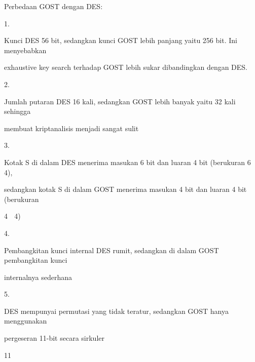 \documentclass{article}
\begin{document}

Perbedaan GOST dengan DES:

1.

Kunci DES 56 bit, sedangkan kunci GOST lebih panjang yaitu 256 bit. Ini menyebabkan 

exhaustive key search terhadap GOST lebih sukar dibandingkan dengan DES.

2.

Jumlah putaran DES 16 kali, sedangkan GOST lebih banyak yaitu 32 kali sehingga 

membuat kriptanalisis menjadi sangat sulit 

3.

Kotak S di dalam DES menerima masukan 6 bit dan luaran 4 bit (berukuran 6  4), 

sedangkan kotak S di dalam GOST menerima masukan 4 bit dan luaran 4 bit (berukuran 

4  4) 

4.

Pembangkitan kunci internal DES rumit, sedangkan di dalam GOST pembangkitan kunci 

internalnya sederhana 

5.

DES mempunyai permutasi yang tidak teratur, sedangkan GOST hanya menggunakan 

pergeseran 11-bit secara sirkuler 

11
\end{document}
